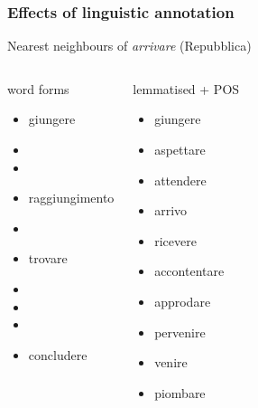 \documentclass[t]{beamer} %
\begin{document}
\begin{frame}
  \frametitle{Effects of linguistic annotation}

  \centering
  Nearest neighbours of \emph{arrivare} (Repubblica)
  \footnotesize
  \begin{columns}[t]
    \column{4cm}
    \begin{block}{word forms}
      \begin{itemize}
      \item  giungere
      \item  {}
      \item  {}
      \item  raggiungimento
      \item  {}
      \item  trovare
      \item  {}
      \item  {}
      \item  {}
      \item  concludere
      \end{itemize}
    \end{block}
    \column{4cm}
    \begin{block}{lemmatised + POS}
      \begin{itemize}
      \item giungere
      \item aspettare
      \item attendere
      \item arrivo 
      \item ricevere
      \item accontentare
      \item approdare
      \item pervenire
      \item venire
      \item piombare
      \end{itemize}
    \end{block}
  \end{columns}
\end{frame}
\end{document}
